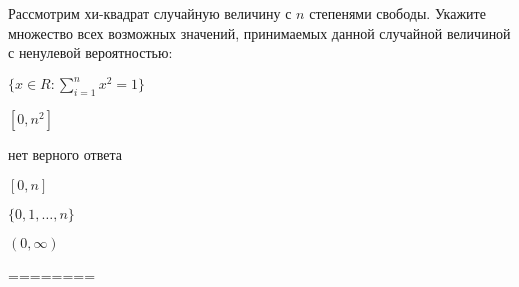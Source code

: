 
\begin{question}
Рассмотрим хи-квадрат случайную величину с \(n\) степенями свободы.
Укажите множество всех возможных значений, принимаемых данной случайной
величиной с ненулевой вероятностью:
\begin{answerlist}
  \item \(\{x\in R:\sum_{i=1}^{n}{x_{{}}^{2}}=1\}\)
  \item \([0,n^2]\)
  \item нет верного ответа
  \item \([0,n]\)
  \item \(\{0, 1, \ldots, n\}\)
  \item \((0, \infty)\)
\end{answerlist}
\end{question}

\begin{solution}
========
\end{solution}

